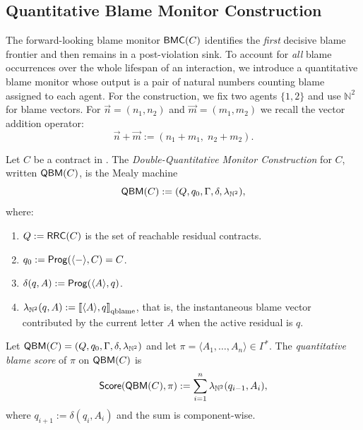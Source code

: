                 \subsection{Quantitative Blame Monitor Construction}
                \label{subsec:qbm}
            
            The forward-looking blame monitor $\mathsf{BMC}(C)$ identifies the \emph{first} decisive blame frontier and then remains in a post-violation sink. To account for \emph{all} blame occurrences over the whole lifespan of an interaction, we introduce a quantitative blame monitor whose output is a pair of natural numbers counting blame assigned to each agent.
            For the construction, we fix two agents $\{1,2\}$ and use $\mathbb{N}^2$ for blame vectors. For $\vec{n}=(n_1,n_2)$ and $\vec{m}=(m_1,m_2)$ we recall the vector addition operator:
            \[
            \vec{n}+\vec{m} := (n_1+m_1,\;n_2+m_2).
            \]
            
            \begin{definition}
            \label{def:qbm}
            Let $C$ be a contract in \cDL. The \emph{Double-Quantitative Monitor Construction} for $C$, written $\mathsf{QBM}(C)$, is the Mealy machine
            \[
            \mathsf{QBM}(C) := (Q,q_0,\Gamma,\delta,\lambda_{\mathbb{N}^2}),
            \]
            where:
            \begin{enumerate}
              \item $Q := \mathsf{RRC}\!\left(C\right)$ is the set of reachable residual contracts.
              \item $q_0 := \mathsf{Prog}(\langle - \rangle ,C)=C$.
              \item $\delta(q,A) := \mathsf{Prog}(\langle A \rangle ,q)$.
              \item $\lambda_{\mathbb{N}^2}(q,A):= \left\llbracket \langle A \rangle ,q \right\rrbracket_{\text{qblame}}$, that is, the instantaneous blame vector contributed by the current letter $A$ when the active residual is $q$.
            \end{enumerate}
            \end{definition}
            
            \begin{definition}
            \label{def:qbm-score}
            Let $\mathsf{QBM}(C)=(Q,q_0,\Gamma,\delta,\lambda_{\mathbb{N}^2})$ and let $\pi=\langle A_1,\dots,A_{n}\rangle\in\Gamma^*$. The \emph{quantitative blame score} of $\pi$ on $\mathsf{QBM}(C)$ is
            \[
            \mathsf{Score}(\mathsf{QBM}(C),\pi) := \sum_{i=1}^{n} \lambda_{\mathbb{N}^2}(q_{i-1},A_i),
            \]
            where $q_{i+1}:=\delta(q_i,A_i)$ and the sum is component-wise.
            \end{definition}
            

